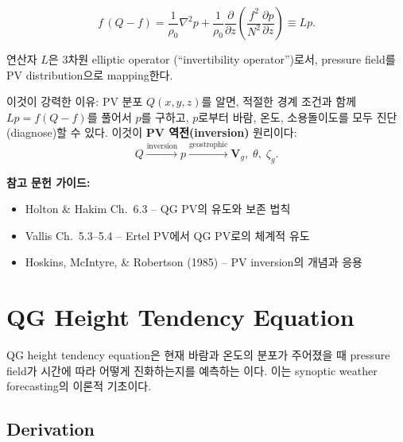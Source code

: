 \begin{equation}\label{eq:qgpv-p-only}
  \boxed{
  f\,(Q - f) = \frac{1}{\rho_0}\nabla^2 p
    + \frac{1}{\rho_0}\frac{\partial}{\partial z}
      \!\left(\frac{f^2}{N^2}\frac{\partial p}{\partial z}\right)
    \equiv Lp.
  }
\end{equation}

\noindent
연산자 $L$은 3차원 elliptic operator (``invertibility operator'')로서,
pressure field를 PV distribution으로 mapping한다.


\begin{hisublock}
이것이 강력한 이유: PV 분포 $Q(x,y,z)$를 알면, 적절한 경계 조건과 함께
$L p = f(Q - f)$를 풀어서 $p$를 구하고, $p$로부터 바람, 온도, 소용돌이도를
모두 진단(diagnose)할 수 있다.  이것이 \textbf{PV 역전(inversion)} 원리이다:
\[
  Q \xrightarrow{\text{inversion}} p
  \xrightarrow{\text{geostrophic}} \mathbf{V}_g, \;\theta, \;\zeta_g.
\]
\end{hisublock}

\begin{hisublock}
\textbf{참고 문헌 가이드:}
\begin{itemize}
  \item Holton \& Hakim Ch.~6.3 -- QG PV의 유도와 보존 법칙
  \item Vallis Ch.~5.3--5.4 -- Ertel PV에서 QG PV로의 체계적 유도
  \item Hoskins, McIntyre, \& Robertson (1985) -- PV inversion의 개념과 응용
\end{itemize}
\end{hisublock}


\section{QG Height Tendency Equation}\label{sec:qg-height-tendency}

QG height tendency equation은 현재 바람과 온도의 분포가 주어졌을 때
pressure field가 시간에 따라 어떻게 진화하는지를 예측하는 이다.
이는 synoptic weather forecasting의 이론적 기초이다.

\subsection{Derivation}\label{subsec:height-tendency-derive}


